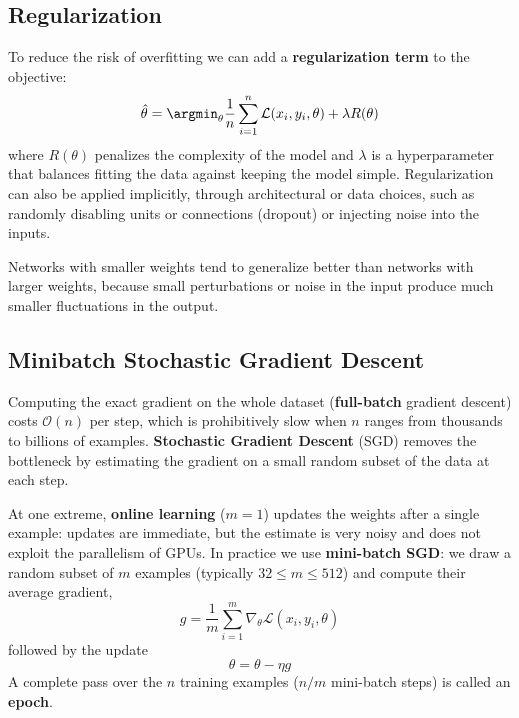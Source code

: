 \subsection{Regularization}
To reduce the risk of overfitting we can add a \textbf{regularization term} to the
objective:
\begin{equation}
    \hat{\theta} = \argmin_{\theta} \frac{1}{n} \sum_{i=1}^n \mathcal{L}(x_i, y_i, \theta)
    + \lambda R(\theta)
\end{equation}
where $R(\theta)$ penalizes the complexity of the model and $\lambda$ is a
hyperparameter that balances fitting the data against keeping the model simple.
Regularization can also be applied implicitly, through architectural or data
choices, such as randomly disabling units or connections (dropout) or injecting
noise into the inputs.
\begin{note}
    Networks with smaller weights tend to generalize better than networks with
    larger weights, because small perturbations or noise in the input produce much
    smaller fluctuations in the output.
\end{note}

\subsection{Minibatch Stochastic Gradient Descent}
Computing the exact gradient on the whole dataset (\textbf{full-batch} gradient
descent) costs $\mathcal{O}(n)$ per step, which is prohibitively slow when $n$
ranges from thousands to billions of examples. \textbf{Stochastic Gradient Descent}
(SGD) removes the bottleneck by estimating the gradient on a small random subset of
the data at each step.

At one extreme, \textbf{online learning} ($m = 1$) updates the weights after a
single example: updates are immediate, but the estimate is very noisy and does not
exploit the parallelism of GPUs. In practice we use \textbf{mini-batch SGD}: we draw
a random subset of $m$ examples (typically $32 \leq m \leq 512$) and compute their
average gradient,
\begin{equation}
    g = \frac{1}{m} \sum_{i = 1}^{m} \nabla_{\theta} \mathcal{L}(x_i, y_i, \theta)
\end{equation}
followed by the update
\begin{equation}
    \theta = \theta - \eta g
\end{equation}
A complete pass over the $n$ training examples ($n/m$ mini-batch steps) is called an
\textbf{epoch}.


